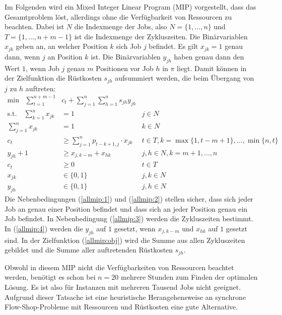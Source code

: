 \documentclass{scrreprt}
\begin{document}
Im Folgenden wird ein Mixed Integer Linear Program (MIP) vorgestellt, dass das Gesamtproblem löst, allerdings ohne die Verfügbarkeit von Ressourcen zu beachten.
Dabei ist $N$ die Indexmenge der Jobs, also $N=\{1,\ldots,n\}$ und $T=\{1,\ldots,n+m-1\}$ ist die Indexmenge der Zykluszeiten.
Die Binärvariablen $x_{jk}$ geben an, an welcher Position $k$
sich Job $j$ befindet. Es gilt $x_{jk}=1$ genau dann, wenn $j$ an Position $k$ ist. 
Die Binärvariablen $y_{jh}$ haben genau dann den Wert $1$, wenn Job $j$ genau $m$ Positionen vor Job $h$ in $\pi$ liegt.
Damit können in der Zielfunktion die Rüstkosten $s_{jh}$ aufsummiert werden, die beim Übergang von $j$ zu $h$ auftreten:
\begin{align}
    \text{min} \quad \sum_{t=1}^{n+m-1} &c_t + \sum_{j=1}^n \sum_{h=1}^n s_{jh} y_{jh} \label{allmip:obj}\\
    \text{s.t.}\quad \sum_{k=1}^n x_{jk} &= 1 & j\in N \label{allmip:1}\\
                     \sum_{j=1}^n x_{jk} &= 1 & k\in N \label{allmip:2}\\
    c_t &\geq \sum_{j=1}^n p_{t-k+1,j} \cdot x_{jk} & t\in T, k=\max\{1,t-m+1\},\ldots,\min\{n,t\} \label{allmip:3}\\
    y_{jh} + 1 &\geq x_{j,k-m} + x_{hk} & j,h\in N, k=m+1,\ldots,n \label{allmip:4}\\
    c_t &\geq 0 & t\in T \\
    x_{jk} &\in \{0,1\} & j,k\in N \\
    y_{jh} &\in \{0,1\} & j,h\in N
\end{align}
Die Nebenbedingungen (\ref{allmip:1}) und (\ref{allmip:2})
stellen sicher, dass sich jeder Job an genau einer Position befindet und 
dass sich an jeder Position genau ein Job befindet.
In Nebenbedingung (\ref{allmip:3}) werden die Zykluszeiten bestimmt.
In (\ref{allmip:4}) werden die $y_{jh}$ auf $1$ gesetzt, wenn $x_{j,k-m}$ und $x_{hk}$ auf $1$ gesetzt sind.
In der Zielfunktion (\ref{allmip:obj}) wird die Summe aus allen
Zykluszeiten gebildet und die Summe aller auftretenden Rüstkosten $s_{jh}$.

Obwohl in diesem MIP nicht die Verfügbarkeiten von Ressourcen beachtet werden,
benötigt es schon bei $n=20$ mehrere Stunden zum Finden der optimalen Lösung.
Es ist also für Instanzen mit mehreren Tausend Jobs nicht geeignet.
Aufgrund dieser Tatsache ist eine heuristische Herangehensweise an 
synchrone Flow-Shop-Probleme mit Ressourcen und Rüstkosten eine gute Alternative.
\end{document}
